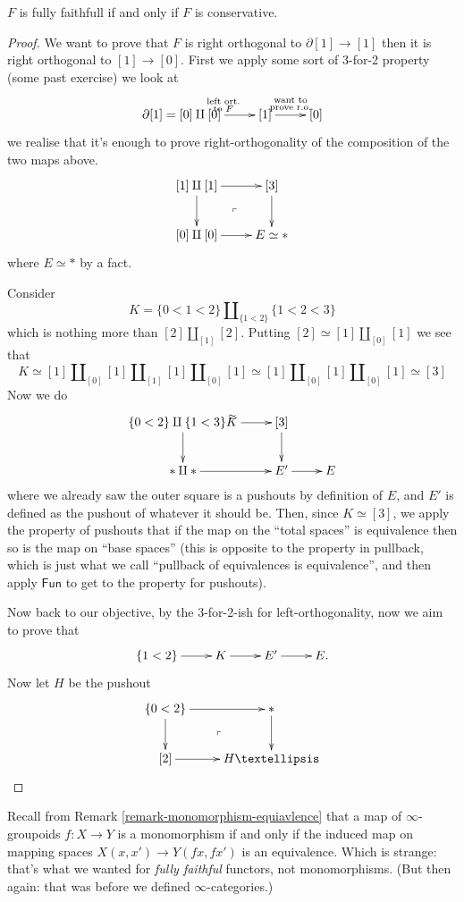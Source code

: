 \begin{theorem}
\label{theorem-fully-faithful-implies-conservative}
$F$ is fully faithfull if and only if
$F$ is conservative.
\end{theorem}

\begin{proof}
We want to prove that $F$ 
is right orthogonal to $\partial[1]\to [1]$
then it is right orthogonal to $[1]\to [0]$.
First we apply some sort of 3-for-2
property (some past exercise)
we look at
$$
\xymatrix{
\partial[1]=[0]\amalg[0]\ar[r]^{\substack{\text{left ort.} \\ \text{to $F$}}}
& [1]\ar[r]^{\substack{\text{want to} \\ \text{prove r.o.}}}
&[0]
}
$$
we realise that it's enough
to prove right-orthogonality of the
composition of the two maps above.
$$
\xymatrix{
[1]\amalg[1]\ar[r]\ar[d]\ar@{}[dr]|-{\ulcorner}&[3]\ar[d]\\
[0]\amalg[0]\ar[r]&E\simeq \ast
}
$$
where $E \simeq *$ by a fact.

Consider
$$
K=\{0<1<2\}\amalg_{\{1<2\}}\{1<2<3\}
$$
which is nothing more than $[2]\amalg_{[1]}[2]$.
Putting $[2]\simeq[1]\amalg_{[0]}[1]$ 
we see that
$$
K\simeq[1]\amalg_{[0]}[1]\amalg_{[1]}[1]\amalg_{[0]}[1]
\simeq[1]\amalg_{[0]}[1]\amalg_{[0]}[1]\simeq[3]
$$
Now we do
$$
\xymatrix{
\{0<2\}\amalg\{1<3\}K\ar[r]^{\simeq}\ar[d]&[3]\ar[d]\\
\ast \amalg \ast\ar[r]&E' \ar[r]&E
}
$$
where we already saw the outer square is
a pushouts by definition of $E$,
and $E'$ is defined as the pushout of
whatever it should be.
Then, since $K \simeq [3]$,
we apply the property of pushouts
that if the map on the ``total spaces''
is equivalence then so is the
map on ``base spaces''
(this is opposite to the property in pullback,
which is just what we call
``pullback of equivalences is equivalence'',
and then apply $\mathsf{Fun}$ 
to get to the property for pushouts).

Now back to our objective,
by the 3-for-2-ish for left-orthogonality,
now we aim to prove that
$$
\xymatrix{
\{1<2\}\ar[r]& K\ar[r]&E'\ar[r]&E.
}
$$
Now let $H$ be the pushout
$$
\xymatrix{
\{0<2\} \ar[r]\ar[d]\ar@{}[dr]|-{\ulcorner}& \ast \ar[d]\\
[2] \ar[r]& H…
}
$$
\end{proof}

Recall from Remark \ref{remark-monomorphism-equiavlence}
that a map of $\infty$-groupoids $f:X \to Y$
is a monomorphism if and only if 
the induced map on mapping spaces
$X(x,x') \to Y(fx,fx')$ is an equivalence.
Which is strange: that's what we wanted for
{\it fully faithful} functors, not monomorphisms.
(But then again: that was before we defined
$\infty$-categories.)

